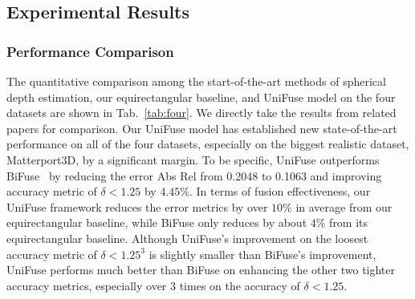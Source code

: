 \documentclass[letterpaper, 10 pt, conference]{ieeeconf}
\begin{document}
\begin{table}[t]
\vspace{5pt}
  \centering
\caption{\textbf{The Statistics of the Datasets.}}
\label{tab:datasets}
\end{table}


\subsection{Experimental Results}

\subsubsection{Performance Comparison}
\label{sec:pc}
The quantitative comparison among the start-of-the-art methods of spherical depth estimation, our equirectangular baseline, and UniFuse model on the four datasets are shown in Tab.~\ref{tab:four}. We directly take the results from related papers for comparison. Our UniFuse model has established new state-of-the-art performance on all of the four datasets, especially on the biggest realistic dataset, Matterport3D, by a significant margin. To be specific, UniFuse outperforms BiFuse~\cite{wang2020bifuse} by reducing the error Abs Rel from 0.2048 to 0.1063 and improving accuracy metric of $\delta<1.25$ by $4.45\%$. In terms of fusion effectiveness, our UniFuse framework reduces the error metrics by over $10\%$ in average from our equirectangular baseline, while BiFuse only reduces by about $4\%$ from its equirectangular baseline. Although UniFuse's improvement on the loosest accuracy metric of $\delta<1.25^3$ is slightly smaller than BiFuse's improvement, UniFuse performs much better than BiFuse on enhancing the other two tighter accuracy metrics, especially over $3$ times on the accuracy of $\delta<1.25$. 
\end{document}
